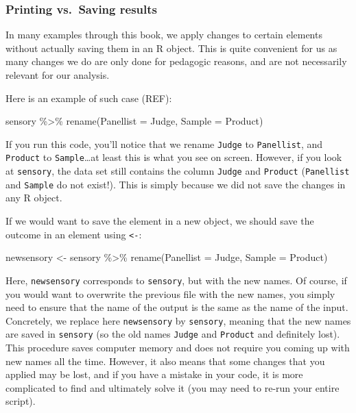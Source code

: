 \documentclass[
]{book}
\newenvironment{Shaded}{\begin{snugshade}}{\end{snugshade}}
\newcommand{\AttributeTok}[1]{\textcolor[rgb]{0.77,0.63,0.00}{#1}}
\newcommand{\FunctionTok}[1]{\textcolor[rgb]{0.00,0.00,0.00}{#1}}
\newcommand{\NormalTok}[1]{#1}
\newcommand{\OtherTok}[1]{\textcolor[rgb]{0.56,0.35,0.01}{#1}}
\newcommand{\SpecialCharTok}[1]{\textcolor[rgb]{0.00,0.00,0.00}{#1}}
\begin{document}
\hypertarget{printing-vs.-saving-results}{%
\subsubsection{Printing vs.~Saving results}\label{printing-vs.-saving-results}}

In many examples through this book, we apply changes to certain elements without actually saving them in an R object. This is quite convenient for us as many changes we do are only done for pedagogic reasons, and are not necessarily relevant for our analysis.

Here is an example of such case (REF):

\begin{Shaded}
\begin{Highlighting}[]
\NormalTok{sensory }\SpecialCharTok{\%\textgreater{}\%} 
  \FunctionTok{rename}\NormalTok{(}\AttributeTok{Panellist =}\NormalTok{ Judge, }\AttributeTok{Sample =}\NormalTok{ Product)}
\end{Highlighting}
\end{Shaded}

If you run this code, you'll notice that we rename \texttt{Judge} to \texttt{Panellist}, and \texttt{Product} to \texttt{Sample}\ldots at least this is what you see on screen. However, if you look at \texttt{sensory}, the data set still contains the column \texttt{Judge} and \texttt{Product} (\texttt{Panellist} and \texttt{Sample} do not exist!). This is simply because we did not save the changes in any R object.

If we would want to save the element in a new object, we should save the outcome in an element using \texttt{\textless{}-}:

\begin{Shaded}
\begin{Highlighting}[]
\NormalTok{newsensory }\OtherTok{\textless{}{-}}\NormalTok{ sensory }\SpecialCharTok{\%\textgreater{}\%} 
  \FunctionTok{rename}\NormalTok{(}\AttributeTok{Panellist =}\NormalTok{ Judge, }\AttributeTok{Sample =}\NormalTok{ Product)}
\end{Highlighting}
\end{Shaded}

Here, \texttt{newsensory} corresponds to \texttt{sensory}, but with the new names. Of course, if you would want to overwrite the previous file with the new names, you simply need to ensure that the name of the output is the same as the name of the input. Concretely, we replace here \texttt{newsensory} by \texttt{sensory}, meaning that the new names are saved in \texttt{sensory} (so the old names \texttt{Judge} and \texttt{Product} and definitely lost). This procedure saves computer memory and does not require you coming up with new names all the time. However, it also means that some changes that you applied may be lost, and if you have a mistake in your code, it is more complicated to find and ultimately solve it (you may need to re-run your entire script).
\end{document}
